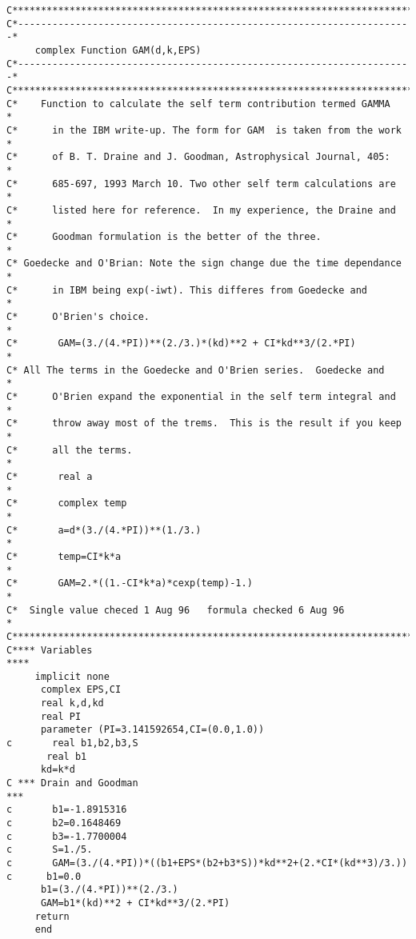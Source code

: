 \documentclass{article}
\begin{document}
\begin{verbatim}
C***********************************************************************       
C*---------------------------------------------------------------------*
     complex Function GAM(d,k,EPS)                                     
C*---------------------------------------------------------------------*      
C***********************************************************************
C*    Function to calculate the self term contribution termed GAMMA    *
C*      in the IBM write-up. The form for GAM  is taken from the work  *
C*      of B. T. Draine and J. Goodman, Astrophysical Journal, 405:    *
C*      685-697, 1993 March 10. Two other self term calculations are   *
C*      listed here for reference.  In my experience, the Draine and   *
C*      Goodman formulation is the better of the three.                *
C* Goedecke and O'Brian: Note the sign change due the time dependance  *
C*      in IBM being exp(-iwt). This differes from Goedecke and        *
C*      O'Brien's choice.                                              *
C*       GAM=(3./(4.*PI))**(2./3.)*(kd)**2 + CI*kd**3/(2.*PI)          *
C* All The terms in the Goedecke and O'Brien series.  Goedecke and     *
C*      O'Brien expand the exponential in the self term integral and   *
C*      throw away most of the trems.  This is the result if you keep  *
C*      all the terms.                                                 *
C*       real a                                                        *
C*       complex temp                                                  *
C*       a=d*(3./(4.*PI))**(1./3.)                                     *
C*       temp=CI*k*a                                                   *
C*       GAM=2.*((1.-CI*k*a)*cexp(temp)-1.)                            * 
C*  Single value checed 1 Aug 96   formula checked 6 Aug 96            *
C***********************************************************************
C**** Variables                                                     ****  
     implicit none
      complex EPS,CI      
      real k,d,kd
      real PI
      parameter (PI=3.141592654,CI=(0.0,1.0)) 
c       real b1,b2,b3,S
       real b1
      kd=k*d
C *** Drain and Goodman                                              ***
c       b1=-1.8915316
c       b2=0.1648469
c       b3=-1.7700004
c       S=1./5.
c       GAM=(3./(4.*PI))*((b1+EPS*(b2+b3*S))*kd**2+(2.*CI*(kd**3)/3.))
c      b1=0.0
      b1=(3./(4.*PI))**(2./3.)
      GAM=b1*(kd)**2 + CI*kd**3/(2.*PI)          
     return
     end
\end{verbatim}%
\end{document}
